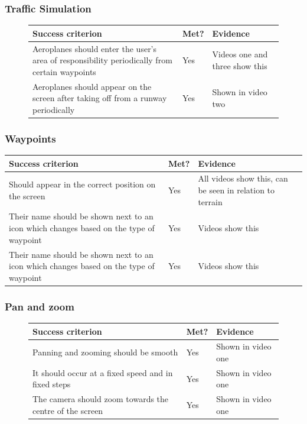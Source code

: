 \documentclass{article}
\begin{document}
\subsubsection{Traffic Simulation}
\begin{figure}[H]
\centering
\begin{tabular}{| p{} | p{} | p{} |}
\hline
\textbf{Success criterion} & \textbf{Met?} & \textbf{Evidence} \\
\hline
Aeroplanes should enter the user's area of responsibility periodically from certain waypoints & Yes & Videos one and three show this \\
\hline
Aeroplanes should appear on the screen after taking off from a runway periodically & Yes & Shown in video two \\
\hline
\end{tabular}
\end{figure}

\subsubsection{Waypoints}
\begin{table}[ht]
\centering
\begin{tabular}{| p{} | p{} | p{} |}
\hline
\textbf{Success criterion} & \textbf{Met?} & \textbf{Evidence} \\
\hline
Should appear in the correct position on the screen & Yes & All videos show this, can be seen in relation to terrain \\
\hline
Their name should be shown next to an icon which changes based on the type of waypoint & Yes & Videos show this \\
\hline
Their name should be shown next to an icon which changes based on the type of waypoint & Yes & Videos show this \\
\hline
\end{tabular}
\end{table}

\subsubsection{Pan and zoom}
\begin{figure}[H]
\centering
\begin{tabular}{| p{} | p{} | p{} |}
\hline
\textbf{Success criterion} & \textbf{Met?} & \textbf{Evidence} \\
\hline
Panning and zooming should be smooth & Yes & Shown in video one \\
\hline
It should occur at a fixed speed and in fixed steps & Yes & Shown in video one \\
\hline
The camera should zoom towards the centre of the screen & Yes & Shown in video one \\
\hline
\end{tabular}
\end{figure}
\end{document}
